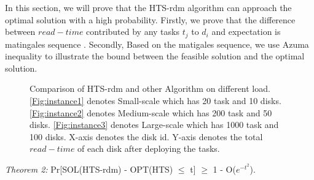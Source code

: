 \documentclass[conference]{IEEEtran}
\begin{document}
In this section, we will prove that the HTS-rdm algorithm can approach the optimal solution with a high probability. Firstly, we prove that the difference between $read-time$ contributed by any tasks $t_j$ to $d_i$ and expectation is matingales sequence \cite{b12}. Secondly, Based on the matigales sequence, we use Azuma inequality to illustrate the bound between the feasible solution and the optimal solution.
\begin{figure}[!t]
	\centering
	\quad\quad %
	\quad\quad
	\vspace{-2ex}
	\caption{Comparison of HTS-rdm and other Algorithm on different load. \ref{Fig:instance1} denotes Small-scale which has 20 task and 10 disks. \ref{Fig:instance2} denotes Medium-scale which has 200 task and 50 disks.
	\ref{Fig:instance3} denotes Large-scale which has 1000 task and 100 disks. X-axis denotes the disk id. Y-axis denotes the total $read-time$ of each disk after deploying the tasks.}
	\label{Fig:comparison}
	\vspace{-3ex}
\end{figure}
\emph{Theorem 2:} Pr[SOL(HTS-rdm) - OPT(HTS) $\leq$ t] $\geq$ 1 - O($e^{-t^2}$).
\end{document}
